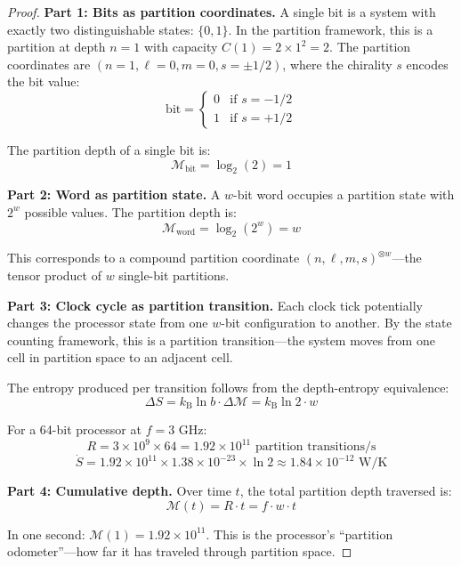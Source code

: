 \documentclass[twocolumn,10pt]{article}
\theoremstyle{remark}
\newcommand{\kB}{k_{\mathrm{B}}}
\newcommand{\Depth}{\mathcal{M}}
\begin{document}
\begin{proof}
\textbf{Part 1: Bits as partition coordinates.}
A single bit is a system with exactly two distinguishable states: $\{0, 1\}$. In the partition framework, this is a partition at depth $n = 1$ with capacity $C(1) = 2 \times 1^2 = 2$. The partition coordinates are $(n=1, \ell=0, m=0, s=\pm 1/2)$, where the chirality $s$ encodes the bit value:
\begin{equation}
    \text{bit} = \begin{cases} 0 & \text{if } s = -1/2 \\ 1 & \text{if } s = +1/2 \end{cases}
\end{equation}

The partition depth of a single bit is:
\begin{equation}
    \Depth_{\text{bit}} = \log_2(2) = 1
\end{equation}

\textbf{Part 2: Word as partition state.}
A $w$-bit word occupies a partition state with $2^w$ possible values. The partition depth is:
\begin{equation}
    \Depth_{\text{word}} = \log_2(2^w) = w
\end{equation}

This corresponds to a compound partition coordinate $(n, \ell, m, s)^{\otimes w}$---the tensor product of $w$ single-bit partitions.

\textbf{Part 3: Clock cycle as partition transition.}
Each clock tick potentially changes the processor state from one $w$-bit configuration to another. By the state counting framework, this is a partition transition---the system moves from one cell in partition space to an adjacent cell.

The entropy produced per transition follows from the depth-entropy equivalence:
\begin{equation}
    \Delta S = \kB \ln b \cdot \Delta\Depth = \kB \ln 2 \cdot w
\end{equation}

For a 64-bit processor at $f = 3$ GHz:
\begin{equation}
    R = 3 \times 10^9 \times 64 = 1.92 \times 10^{11} \text{ partition transitions/s}
\end{equation}
\begin{equation}
    \dot{S} = 1.92 \times 10^{11} \times 1.38 \times 10^{-23} \times \ln 2 \approx 1.84 \times 10^{-12} \text{ W/K}
\end{equation}

\textbf{Part 4: Cumulative depth.}
Over time $t$, the total partition depth traversed is:
\begin{equation}
    \Depth(t) = R \cdot t = f \cdot w \cdot t
\end{equation}

In one second: $\Depth(1) = 1.92 \times 10^{11}$. This is the processor's ``partition odometer''---how far it has traveled through partition space.
\end{proof}
\end{document}
